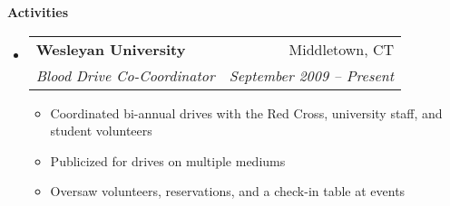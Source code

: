 \documentclass[letterpaper,11pt]{article}
\makeatletter
\newcommand{\resitem}[1]{\item #1 \vspace{-2pt}}
\newcommand{\resheading}[1]{{\large \colorbox{mygrey}{\begin{minipage}{\textwidth}{\textbf{#1 \vphantom{p\^{E}}}}\end{minipage}}}}
\newcommand{\ressubheading}[4]{
\begin{tabular*}{7in}{l@{\extracolsep{\fill}}r} 
		\textbf{#1} & #2 \\
		\textit{#3} & \textit{#4} \\
\end{tabular*}\vspace{-2pt}}
\makeatother
\begin{document}
\resheading{Activities}
   \begin{itemize}

       \item
	\ressubheading{Wesleyan University}{Middletown, CT}{Blood Drive Co-Coordinator}{September 2009 -- Present}
	{\footnotesize	\begin{itemize}
	    \resitem{Coordinated bi-annual drives with the Red Cross, university staff, and student volunteers}
	    \resitem{Publicized for drives on multiple mediums}
	    \resitem{Oversaw volunteers, reservations, and a check-in table at events}
	\end{itemize}	}



\end{itemize} %
\end{document}
